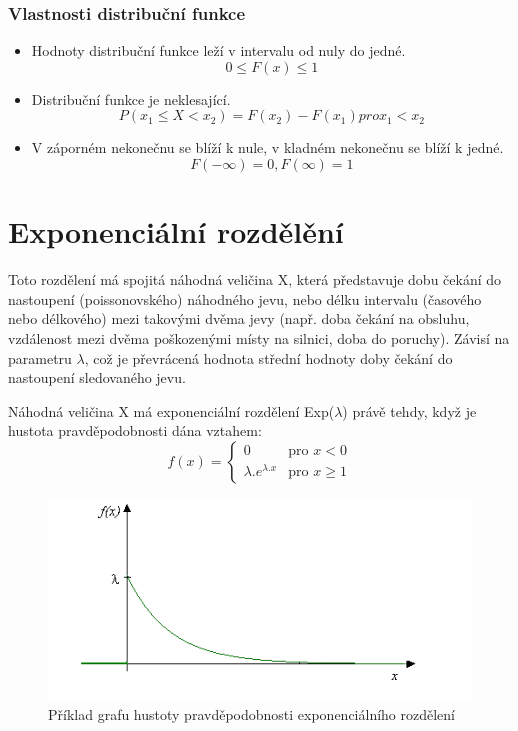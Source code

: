 \documentclass[FM,RP]{tulthesis}
\begin{document}
        \subsubsection{Vlastnosti distribuční funkce}
            \begin{itemize} 
                \item
                Hodnoty distribuční funkce leží v intervalu od nuly do jedné.
                $$ 0 \leq F(x) \leq 1 $$
                \item
                Distribuční funkce je neklesající.
                $$  P(x_{1} \leq X < x_{2}) = F(x_{2}) - F(x_{1})   pro x_{1} < x_{2} $$
                \item
                V záporném nekonečnu se blíží k nule, v kladném nekonečnu se blíží k jedné.
                $$ F(- ∞) = 0, F(∞) = 1 $$ 
            \end{itemize}

    \section{Exponenciální rozdělění}
        Toto rozdělení má spojitá náhodná veličina X, která představuje dobu čekání do nastoupení (poissonovského) náhodného jevu, 
        nebo délku intervalu (časového nebo délkového) mezi takovými dvěma jevy (např. doba čekání na obsluhu, vzdálenost mezi dvěma poškozenými místy na silnici, doba do poruchy).
        Závisí na parametru $ \lambda $, což je převrácená hodnota střední hodnoty doby čekání do nastoupení sledovaného jevu. \cite{7}

        Náhodná veličina X má exponenciální rozdělení Exp($ \lambda $) právě tehdy, když je hustota pravděpodobnosti dána vztahem:
        $$  f(x) = \left\{ \begin{array}{ll}
            0 & \mbox{pro }x<0 \\
            \lambda.e^{\lambda.x} & \mbox{pro }x\geq 1
            \end{array} \right. $$
            \begin{figure}[h]
                \centering
                \includegraphics[scale=0.75]{pic/hustota.png}
                \caption{Příklad grafu hustoty pravděpodobnosti exponenciálního rozdělení} \label{Obrázek č. 2.1}
            \end{figure}
\end{document}

